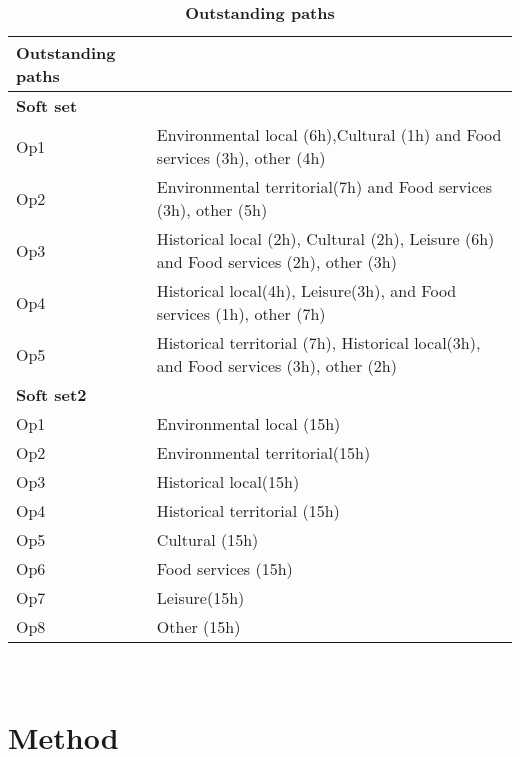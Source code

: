 \documentclass[version=last, pagesize, twoside=semi, DIV=calc, 12pt, a4paper, french, english]{scrartcl}
\begin{document}
\begin{table}[h]
\centering
\begin{tabular}{ll}
\hline
\textbf{Outstanding paths}\\
\hline
\textbf{Soft set}\\
\parbox{2cm}{Op1}&\parbox{8cm}{Environmental local (6h),Cultural (1h) and Food services (3h), other (4h)}\\
\parbox{2cm}{Op2}&\parbox{8cm}{Environmental territorial(7h) and Food services (3h), other (5h)}\\
\parbox{2cm}{Op3}&\parbox{8cm}{Historical local (2h), Cultural (2h), Leisure (6h) and Food services (2h), other (3h)}\\
\parbox{2cm}{Op4}&\parbox{8cm}{Historical local(4h), Leisure(3h), and Food services (1h), other (7h)}\\
\parbox{2cm}{Op5}&\parbox{8cm}{Historical territorial (7h), Historical local(3h), and Food services (3h), other (2h)}\\
\hline
\textbf{Soft set2}\\
\parbox{2cm}{Op1}&\parbox{8cm}{Environmental local (15h)}\\
\parbox{2cm}{Op2}&\parbox{8cm}{Environmental territorial(15h)}\\
\parbox{2cm}{Op3}&\parbox{8cm}{Historical local(15h)}\\
\parbox{2cm}{Op4}&\parbox{8cm}{Historical territorial (15h)}\\
\parbox{2cm}{Op5}&\parbox{8cm}{Cultural (15h)}\\
\parbox{2cm}{Op6}&\parbox{8cm}{Food services (15h)}\\
\parbox{2cm}{Op7}&\parbox{8cm}{Leisure(15h)}\\
\parbox{2cm}{Op8}&\parbox{8cm}{Other (15h)}\\
\hline
\end{tabular}
\caption{\textbf{Outstanding paths}}\
\label{Table}
\end{table}





\section{Method}
\end{document}
